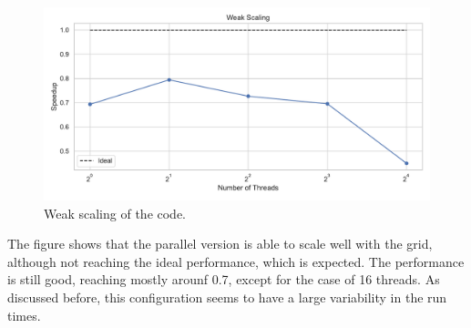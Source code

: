 \documentclass[unicode,11pt,a4paper,oneside,numbers=endperiod,openany]{scrartcl}
\begin{document}
\begin{figure}[!h]
    \centering
    \includegraphics[width=\textwidth]{../mini_app/weak_scaling_plot.pdf}
    \caption{Weak scaling of the code.}
    \label{im:weak_scaling}
\end{figure}
The figure shows that the parallel version is able to scale well with the grid,
although not reaching the ideal performance, which is expected. The performance
is still good, reaching mostly arounf 0.7, except for the case of 16 threads. As
discussed before, this configuration seems to have a large variability in the
run times.
\end{document}
